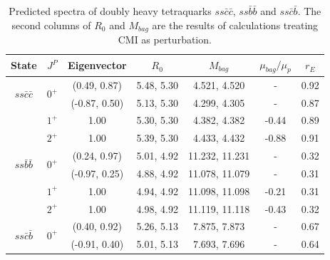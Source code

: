 \documentclass[prt,twocolumn,floatfix,nofootinbib]{revtex4}
\begin{document}
\renewcommand{\tabcolsep}{0.4cm}
\renewcommand{\arraystretch}{1.2}
\begin{table}[!htbp]
    \caption{Predicted spectra of doubly heavy tetraquarks $ss\bar{c}\bar{c}$, $ss\bar{b}\bar{b}$ and $ss\bar{c}\bar{b}$.
    The second columns of $R_{0}$ and $M_{bag}$ are the results of calculations treating CMI as perturbation. }
    \label{tab:2heavytetraquark0}
    \begin{tabular}{ccccccc}
        \hline\hline
        {\rm State}     &$J^{P}$    &{\rm Eigenvector}      &$R_{0}$    &$M_{bag}$  &$\mu_{bag}/\mu_{p}$    &$r_{E}$ \\ \hline
        \multirow{2}{*}{$ss\bar{c}\bar{c}$}
                        &\multirow{2}{*}{$0^{+}$}
                                    &(0.49, 0.87)           &5.48, 5.30	    &4.521, 4.520	    &-                      &0.92 \\
                        &           &(-0.87, 0.50)          &5.13, 5.30	    &4.299, 4.305	    &-                      &0.87 \\
                        &$1^{+}$    &1.00                   &5.30, 5.30	    &4.382, 4.382	    &-0.44                  &0.89 \\
                        &$2^{+}$    &1.00                   &5.39, 5.30	    &4.433, 4.432	    &-0.88                  &0.91 \\
        \multirow{2}{*}{$ss\bar{b}\bar{b}$}
                        &\multirow{2}{*}{$0^{+}$}
                                    &(0.24, 0.97)           &5.01, 4.92	    &11.232, 11.231	    &-                      &0.32 \\
                        &           &(-0.97, 0.25)          &4.88, 4.92	    &11.078, 11.079	    &-                      &0.31 \\
                        &$1^{+}$    &1.00                   &4.94, 4.92	    &11.098, 11.098	    &-0.21                  &0.31 \\
                        &$2^{+}$    &1.00                   &4.98, 4.92	    &11.119, 11.118	    &-0.43                  &0.32 \\
        \multirow{2}{*}{$ss\bar{c}\bar{b}$}
                        &\multirow{2}{*}{$0^{+}$}
                                    &(0.40, 0.92)           &5.26, 5.13	    &7.875, 7.873	    &-                      &0.67 \\
                        &           &(-0.91, 0.40)          &5.01, 5.13	    &7.693, 7.696	    &-                      &0.64 \\

\end{tabular}
\end{table}
\end{document}

